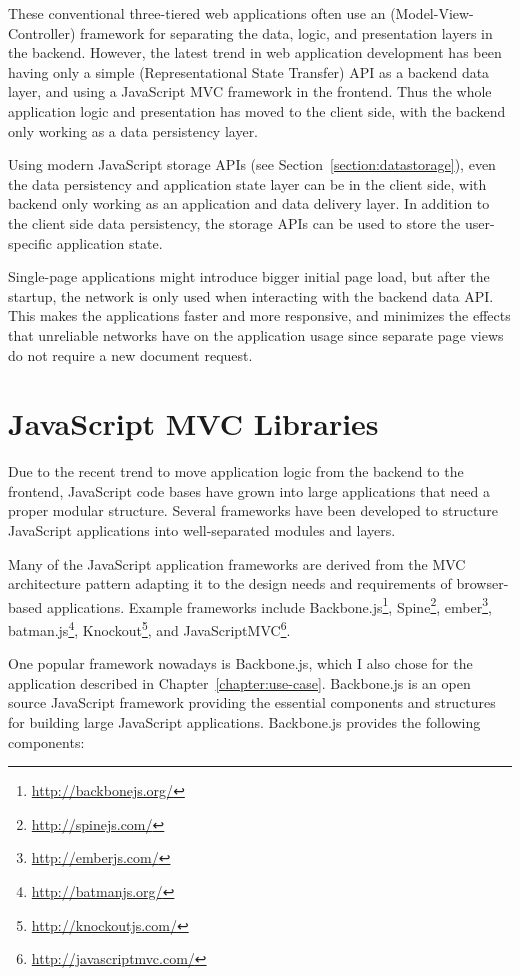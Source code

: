 These conventional three-tiered web applications
\cite{laine2011towards} often use an 
(Model-View-Controller) \cite{gamma1995design} framework for
separating the data, logic, and presentation layers in the
backend. However, the latest trend in web application development has
been having only a simple  (Representational State
Transfer) \cite{fielding2000architectural} API as a backend data
layer, and using a JavaScript MVC framework in the frontend. Thus the
whole application logic and presentation has moved to the client side,
with the backend only working as a data persistency layer.

Using modern JavaScript storage APIs (see
Section~\ref{section:datastorage}), even the data persistency and
application state layer can be in the client side, with backend only
working as an application and data delivery layer. In addition to the
client side data persistency, the storage APIs can be used to store
the user-specific application state.

Single-page applications might introduce bigger initial page load, but
after the startup, the network is only used when interacting with the
backend data API. This makes the applications faster and more
responsive, and minimizes the effects that unreliable networks have on
the application usage since separate page views do not require a new
document request.

\section{JavaScript MVC Libraries}
\label{section:js-mvc}

Due to the recent trend to move application logic from the backend to
the frontend, JavaScript code bases have grown into large applications
that need a proper modular structure. Several frameworks have been
developed to structure JavaScript applications into well-separated
modules and layers.

Many of the JavaScript application frameworks are derived from the MVC
architecture pattern adapting it to the design needs and requirements
of browser-based applications. Example frameworks include
Backbone.js\footnote{\url{http://backbonejs.org/}},
Spine\footnote{\url{http://spinejs.com/}},
ember\footnote{\url{http://emberjs.com/}},
batman.js\footnote{\url{http://batmanjs.org/}},
Knockout\footnote{\url{http://knockoutjs.com/}}, and
JavaScriptMVC\footnote{\url{http://javascriptmvc.com/}}.

One popular framework nowadays is Backbone.js, which I also chose for
the application described in
Chapter~\ref{chapter:use-case}. Backbone.js is an open source
JavaScript framework providing the essential components and structures
for building large JavaScript applications. Backbone.js provides the
following components:

